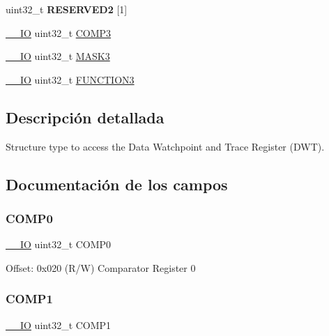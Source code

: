 \begin{DoxyCompactItemize}
\item 
\mbox{\label{struct_d_w_t___type_a032c71ff46a97d2398e5c15a1b4fa50d}} 
uint32\+\_\+t {\bfseries R\+E\+S\+E\+R\+V\+E\+D2} \mbox{[}1\mbox{]}
\item 
\mbox{\hyperlink{core__cm3_8h_aec43007d9998a0a0e01faede4133d6be}{\+\_\+\+\_\+\+IO}} uint32\+\_\+t \mbox{\hyperlink{struct_d_w_t___type_a923d50abd92dbc50ef2983770489eafd}{C\+O\+M\+P3}}
\item 
\mbox{\hyperlink{core__cm3_8h_aec43007d9998a0a0e01faede4133d6be}{\+\_\+\+\_\+\+IO}} uint32\+\_\+t \mbox{\hyperlink{struct_d_w_t___type_a541b20e412d5586312fa4dac4a151660}{M\+A\+S\+K3}}
\item 
\mbox{\hyperlink{core__cm3_8h_aec43007d9998a0a0e01faede4133d6be}{\+\_\+\+\_\+\+IO}} uint32\+\_\+t \mbox{\hyperlink{struct_d_w_t___type_ad3bf90012b7b60cd030c54ed0ec0442d}{F\+U\+N\+C\+T\+I\+O\+N3}}
\end{DoxyCompactItemize}


\subsection{Descripción detallada}
Structure type to access the Data Watchpoint and Trace Register (D\+WT). 

\subsection{Documentación de los campos}
\mbox{\label{struct_d_w_t___type_a00be2e0bf3e38ab6f33f8349d9e7a200}} 
\subsubsection{\texorpdfstring{C\+O\+M\+P0}{COMP0}}
{\footnotesize\ttfamily \mbox{\hyperlink{core__cm3_8h_aec43007d9998a0a0e01faede4133d6be}{\+\_\+\+\_\+\+IO}} uint32\+\_\+t C\+O\+M\+P0}

Offset\+: 0x020 (R/W) Comparator Register 0 \mbox{\label{struct_d_w_t___type_a711f336367372393a5f874e5c46e2b95}} 
\subsubsection{\texorpdfstring{C\+O\+M\+P1}{COMP1}}
{\footnotesize\ttfamily \mbox{\hyperlink{core__cm3_8h_aec43007d9998a0a0e01faede4133d6be}{\+\_\+\+\_\+\+IO}} uint32\+\_\+t C\+O\+M\+P1}

